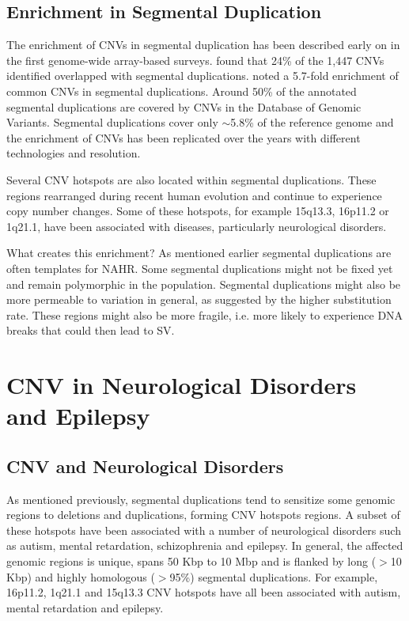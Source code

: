 \subsection{Enrichment in Segmental Duplication}

The enrichment of CNVs in segmental duplication has been described early on in the first genome-wide array-based surveys\cite{Iafrate2004,Sebat2004}.
\citet{Redon2006} found that 24\% of the 1,447 CNVs identified overlapped with segmental duplications.
\citet{Wong2007} noted a 5.7-fold enrichment of common CNVs in segmental duplications.
Around 50\% of the annotated segmental duplications are covered by CNVs in the Database of Genomic Variants\cite{Zarrei2015}.
Segmental duplications cover only $\sim$5.8\% of the reference genome and the enrichment of CNVs has been replicated over the years with different technologies and resolution\cite{Mills2011,Chaisson2014,Alkan2009}.

Several CNV hotspots are also located within segmental duplications\cite{Itsara2009}.
These regions rearranged during recent human evolution and continue to experience copy number changes.
Some of these hotspots, for example 15q13.3, 16p11.2 or 1q21.1, have been associated with diseases, particularly neurological disorders\cite{Mefford2009}.

What creates this enrichment?
As mentioned earlier segmental duplications are often templates for NAHR.
Some segmental duplications might not be fixed yet and remain polymorphic in the population.
Segmental duplications might also be more permeable to variation in general, as suggested by the higher substitution rate\cite{She2006}.
These regions might also be more fragile, i.e. more likely to experience DNA breaks that could then lead to SV.


\section{CNV in Neurological Disorders and Epilepsy}

\subsection{CNV and Neurological Disorders}
As mentioned previously, segmental duplications tend to sensitize some genomic regions to deletions and duplications, forming CNV hotspots regions.
A subset of these hotspots have been associated with a number of neurological disorders such as autism, mental retardation, schizophrenia and epilepsy.
In general, the affected genomic regions is unique, spans 50 Kbp to 10 Mbp and is flanked by long ($>$10 Kbp) and highly homologous ($>$95\%) segmental duplications.
For example, 16p11.2, 1q21.1 and 15q13.3 CNV hotspots have all been associated with autism, mental retardation and epilepsy\cite{Mefford2009}.


